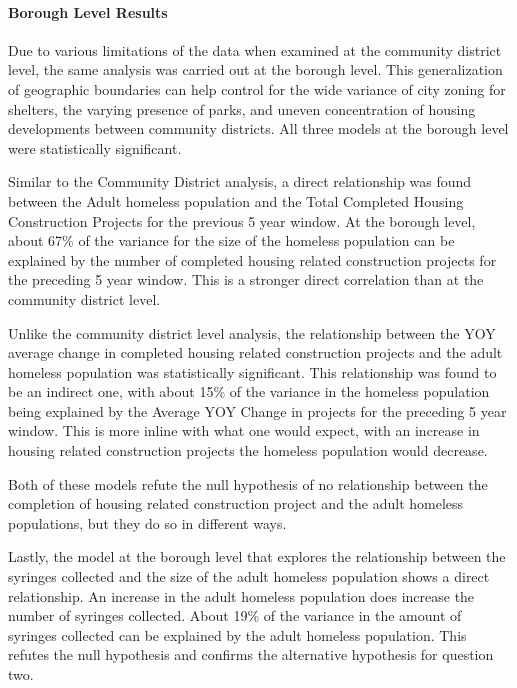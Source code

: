 \documentclass[
]{article}
\begin{document}
\paragraph{Borough Level Results}\label{borough-level-results}

Due to various limitations of the data when examined at the community
district level, the same analysis was carried out at the borough level.
This generalization of geographic boundaries can help control for the
wide variance of city zoning for shelters, the varying presence of
parks, and uneven concentration of housing developments between
community districts. All three models at the borough level were
statistically significant.

Similar to the Community District analysis, a direct relationship was
found between the Adult homeless population and the Total Completed
Housing Construction Projects for the previous 5 year window. At the
borough level, about 67\% of the variance for the size of the homeless
population can be explained by the number of completed housing related
construction projects for the preceding 5 year window. This is a
stronger direct correlation than at the community district level.

Unlike the community district level analysis, the relationship between
the YOY average change in completed housing related construction
projects and the adult homeless population was statistically
significant. This relationship was found to be an indirect one, with
about 15\% of the variance in the homeless population being explained by
the Average YOY Change in projects for the preceding 5 year window. This
is more inline with what one would expect, with an increase in housing
related construction projects the homeless population would decrease.

Both of these models refute the null hypothesis of no relationship
between the completion of housing related construction project and the
adult homeless populations, but they do so in different ways.

Lastly, the model at the borough level that explores the relationship
between the syringes collected and the size of the adult homeless
population shows a direct relationship. An increase in the adult
homeless population does increase the number of syringes collected.
About 19\% of the variance in the amount of syringes collected can be
explained by the adult homeless population. This refutes the null
hypothesis and confirms the alternative hypothesis for question two.
\end{document}
